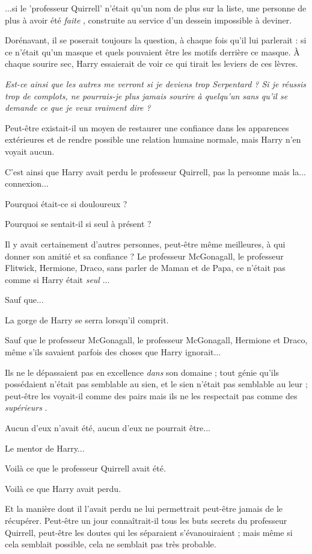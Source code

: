 ...si le 'professeur Quirrell' n'était qu'un nom de plus sur la liste, une personne de plus à avoir été \emph{faite} , construite au service d'un dessein impossible à deviner.

Dorénavant, il se poserait toujours la question, à chaque fois qu'il lui parlerait : si ce n'était qu'un masque et quels pouvaient être les motifs derrière ce masque. À chaque sourire sec, Harry essaierait de voir ce qui tirait les leviers de ces lèvres.

\emph{Est-ce ainsi que les autres me verront si je deviens trop Serpentard ? Si je réussis trop de complots, ne pourrais-je plus jamais sourire à quelqu'un sans qu'il se demande ce que je veux vraiment dire ?} 

Peut-être existait-il un moyen de restaurer une confiance dans les apparences extérieures et de rendre possible une relation humaine normale, mais Harry n'en voyait aucun.

C'est ainsi que Harry avait perdu le professeur Quirrell, pas la personne mais la... connexion...

Pourquoi était-ce si douloureux ?

Pourquoi se sentait-il si seul à présent ?

Il y avait certainement d'autres personnes, peut-être même meilleures, à qui donner son amitié et sa confiance ? Le professeur McGonagall, le professeur Flitwick, Hermione, Draco, sans parler de Maman et de Papa, ce n'était pas comme si Harry était \emph{seul} ...

Sauf que...

La gorge de Harry se serra lorsqu'il comprit.

Sauf que le professeur McGonagall, le professeur McGonagall, Hermione et Draco, même s'ils savaient parfois des choses que Harry ignorait...

Ils ne le dépassaient pas en excellence \emph{dans}  son domaine ; tout génie qu'ils possédaient n'était pas semblable au sien, et le sien n'était pas semblable au leur ; peut-être les voyait-il comme des pairs mais ils ne les respectait pas comme des \emph{supérieurs} .

Aucun d'eux n'avait été, aucun d'eux ne pourrait être...

Le mentor de Harry...

Voilà ce que le professeur Quirrell avait été.

Voilà ce que Harry avait perdu.

Et la manière dont il l'avait perdu ne lui permettrait peut-être jamais de le récupérer. Peut-être un jour connaîtrait-il tous les buts secrets du professeur Quirrell, peut-être les doutes qui les séparaient s'évanouiraient ; mais même si cela semblait possible, cela ne semblait pas très probable.

